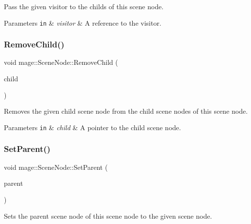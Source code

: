 Pass the given visitor to the childs of this scene node.


\begin{DoxyParams}[1]{Parameters}
\mbox{\tt in}  & {\em visitor} & A reference to the visitor. \\
\hline
\end{DoxyParams}
\hypertarget{classmage_1_1_scene_node_a42aa6487f21c948ab7ce6f64a57e5f11}{}\label{classmage_1_1_scene_node_a42aa6487f21c948ab7ce6f64a57e5f11} 
\subsubsection{\texorpdfstring{Remove\+Child()}{RemoveChild()}}
{\footnotesize\ttfamily void mage\+::\+Scene\+Node\+::\+Remove\+Child (\begin{DoxyParamCaption}\item[{\hyperlink{classmage_1_1_scene_node}{Scene\+Node} $\ast$}]{child }\end{DoxyParamCaption})}

Removes the given child scene node from the child scene nodes of this scene node.


\begin{DoxyParams}[1]{Parameters}
\mbox{\tt in}  & {\em child} & A pointer to the child scene node. \\
\hline
\end{DoxyParams}
\hypertarget{classmage_1_1_scene_node_a27d5219ff4c1f2b1c37899456af518ae}{}\label{classmage_1_1_scene_node_a27d5219ff4c1f2b1c37899456af518ae} 
\subsubsection{\texorpdfstring{Set\+Parent()}{SetParent()}}
{\footnotesize\ttfamily void mage\+::\+Scene\+Node\+::\+Set\+Parent (\begin{DoxyParamCaption}\item[{\hyperlink{classmage_1_1_scene_node}{Scene\+Node} $\ast$}]{parent }\end{DoxyParamCaption})\hspace{0.3cm}{\ttfamily [private]}}

Sets the parent scene node of this scene node to the given scene node.


